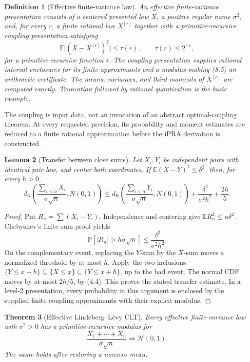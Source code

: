 \documentclass[11pt]{article}
\newtheorem{theorem}{Theorem}[section]
\newtheorem{lemma}[theorem]{Lemma}
\newtheorem{definition}[theorem]{Definition}
\newcommand{\E}{\mathbb E}
\newcommand{\Pp}{\mathbb P}
\newcommand{\dk}{d_{\mathrm K}}
\begin{document}
\begin{definition}[Effective finite-variance law]
An effective finite-variance presentation consists of a centered presented
law \(X\), a positive regular name \(\sigma^2\), and, for every \(r\), a
finite rational law \(X^{[r]}\) together with a primitive-recursive coupling
presentation satisfying
\[
 \E\bigl[(X-X^{[r]})^2\bigr]\le \tau(r),
 \qquad \tau(r)\le2^{-r},                             \tag{8.5}
\]
for a primitive-recursive function \(\tau\).  The coupling presentation
supplies rational interval enclosures for its finite approximants and a
modulus making (8.5) an arithmetic certificate.  The means, variances, and
third moments of \(X^{[r]}\) are computed exactly.  Truncation followed by
rational quantization is the basic example.
\end{definition}

The coupling is input data, not an invocation of an abstract optimal-coupling
theorem.  At every requested precision, its probability and moment estimates
are reduced to a finite rational approximation before the iPRA derivation is
constructed.

\begin{lemma}[Transfer between close sums]\label{lem:l2-transfer}
Let \(X_i,Y_i\) be independent pairs with identical pair law, and center both
coordinates.  If \(\E(X-Y)^2\le\delta^2\), then, for every \(h>0\),
\[
 \dk\!\left(\frac{\sum_{i<n}X_i}{\sigma\sqrt n},N(0,1)\right)
 \le
 \dk\!\left(\frac{\sum_{i<n}Y_i}{\sigma\sqrt n},N(0,1)\right)
 +\frac{\delta^2}{\sigma^2h^2}+\frac{2h}{5}.          \tag{8.6}
\]
\end{lemma}

\begin{proof}
Put \(R_n=\sum(X_i-Y_i)\).  Independence and centering give
\(\E R_n^2\le n\delta^2\).  Chebyshev's finite-sum proof yields
\[
 \Pp[|R_n|>h\sigma\sqrt n]\le\frac{\delta^2}{\sigma^2h^2}. \tag{8.7}
\]
On the complementary event, replacing the \(Y\)-sum by the \(X\)-sum moves
a normalized threshold by at most \(h\).  Apply the two inclusions
\(\{Y\le x-h\}\subseteq\{X\le x\}\subseteq\{Y\le x+h\}\), up to the bad
event.  The normal CDF moves by at most \(2h/5\), by (4.4).  This proves the stated transfer estimate.  In a level-2 presentation,
every probability in this argument is enclosed by the supplied finite
coupling approximants with their explicit modulus.
\end{proof}

\begin{theorem}[Effective Lindeberg--L\'evy CLT]\label{thm:effective-iid}
Every effective finite-variance law with \(\sigma^2>0\) has a
primitive-recursive modulus for
\[
 \frac{X_1+\cdots+X_n}{\sigma\sqrt n}
 \Longrightarrow\mathcal N(0,1).                     \tag{8.8}
\]
The same holds after restoring a nonzero mean.
\end{theorem}
\end{document}
